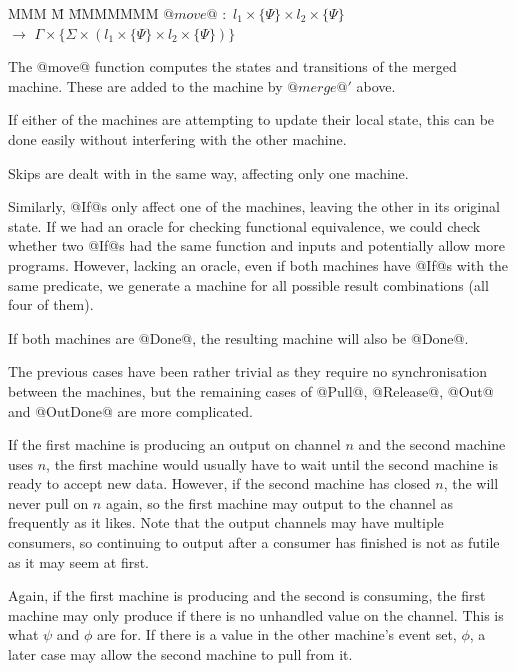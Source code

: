 \begin{tabbing}
MMM \= M \= MMMMMMM\kill
$@move@$ \> $:$ \> $l_1 \times \{\Psi\} \times l_2 \times \{\Psi\}$ \\
           \> $\to$ \> $\Gamma \times \{\Sigma \times (l_1 \times \{\Psi\} \times l_2 \times \{\Psi\})\}$ \\
\end{tabbing}

The @move@ function computes the states and transitions of the merged machine.
These are added to the machine by $@merge@'$ above.



If either of the machines are attempting to update their local state, this can be done easily without interfering with the other machine.

Skips are dealt with in the same way, affecting only one machine.

Similarly, @If@s only affect one of the machines, leaving the other in its original state.
If we had an oracle for checking functional equivalence, we could check whether two @If@s had the same function and inputs and potentially allow more programs.
However, lacking an oracle, even if both machines have @If@s with the same predicate, we generate a machine for all possible result combinations (all four of them).

If both machines are @Done@, the resulting machine will also be @Done@.

The previous cases have been rather trivial as they require no synchronisation between the machines, but the remaining cases of @Pull@, @Release@, @Out@ and @OutDone@ are more complicated.

If the first machine is producing an output on channel $n$ and the second machine uses $n$, the first machine would usually have to wait until the second machine is ready to accept new data.
However, if the second machine has closed $n$, the will never pull on $n$ again, so the first machine may output to the channel as frequently as it likes.
Note that the output channels may have multiple consumers, so continuing to output after a consumer has finished is not as futile as it may seem at first.

Again, if the first machine is producing and the second is consuming, the first machine may only produce if there is no unhandled value on the channel.
This is what $\psi$ and $\phi$ are for.
If there is a value in the other machine's event set, $\phi$, a later case may allow the second machine to pull from it.

